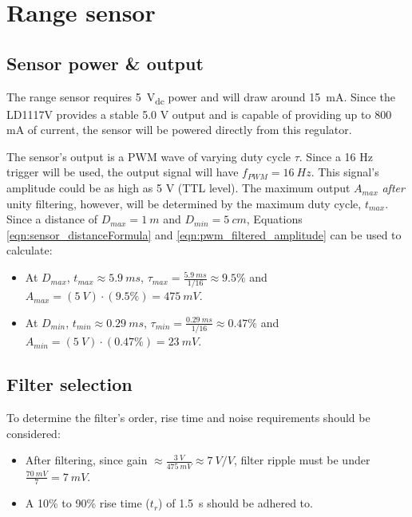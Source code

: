 \graphicspath{{content/2_design/figures/}}
\section{Range sensor}
\subsection{Sensor power \& output}{\label{rangeSensor_powerOutput}}
The range sensor requires \SI{5}{V_{dc}} power and will draw around \SI{15}{mA}. Since the LD1117V provides a stable 5.0 V output and is capable
of providing up to 800 mA of current, the sensor will be powered directly from this regulator.

The sensor's output is a PWM wave of varying duty cycle $\tau$. Since a 16 Hz trigger will be used, the output signal
will have $f_{PWM} = \SI{16}{Hz}$. This signal's amplitude could be as high as 5 V (TTL level). The maximum output $A_{max}$ \textit{after} unity filtering,
however, will be determined by the maximum duty cycle, $t_{max}$. Since a distance of $D_{max} = \SI{1}{m}$ and $D_{min} = \SI{5}{cm}$,
Equations \ref{eqn:sensor_distanceFormula} and \ref{eqn:pwm_filtered_amplitude} can be used to calculate:
\begin{itemize}
  \item At $D_{max}$, $t_{max} \approx \SI{5.9}{ms}$, $\tau_{max} = \frac{\SI{5.9}{ms}}{1/16} \approx 9.5 \%$ and $A_{max} = (\SI{5}{V}) \cdot (9.5 \%) = \SI{475}{mV} $.
  \item At $D_{min}$, $t_{min} \approx \SI{0.29}{ms}$, $\tau_{min} = \frac{\SI{0.29}{ms}}{1/16} \approx 0.47 \%$ and $A_{min} = (\SI{5}{V}) \cdot (0.47 \%) = \SI{23}{mV} $.
\end{itemize}

\subsection{Filter selection}{\label{rangeSensor_filterSelection}}

To determine the filter's order, rise time and noise requirements should be considered:
\begin{itemize}
  \item After filtering, since gain $\approx \frac{\SI{3}{V}}{\SI{475}{mV}} \approx \SI{7}{V/V}$, filter ripple must be under $ \frac{\SI{70}{mV}}{7} = \SI{7}{mV}$.
  \item A 10\% to 90\% rise time ($t_r$) of \SI{1.5}{s} should be adhered to.
\end{itemize}

